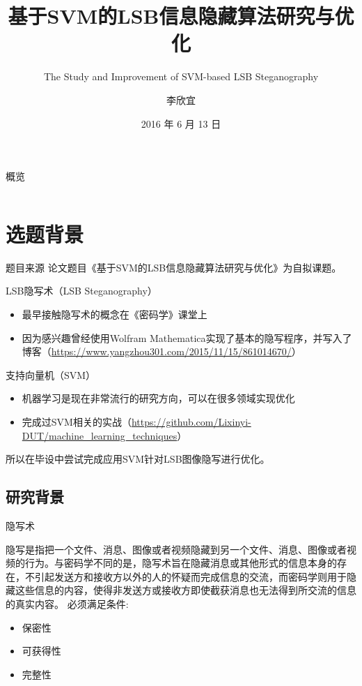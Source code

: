 \documentclass[14pt]{Bredelebeamer}
\title[本科毕设]{基于SVM的LSB信息隐藏算法研究与优化}
\subtitle{The Study and Improvement of SVM-based LSB Steganography}
\author[扬州计划]{李欣宜}
\institute[]{大连理工大学}
\date{\faCalendar{ } 2016 年 6 月 13 日}
\begin{document}
\begin{frame}
  \titlepage
\end{frame}

\begin{frame}{概览}
  \begin{columns}
    \begin{column}{.5\textwidth}
        \tableofcontents
    \end{column}
  \end{columns}
\end{frame}

\section{选题背景}
\begin{frame}{题目来源}
  论文题目《基于SVM的LSB信息隐藏算法研究与优化》为自拟课题。
  \begin{alertblock}{LSB隐写术（LSB Steganography）}
    \begin{itemize}
      \item 最早接触隐写术的概念在《密码学》课堂上
      \item 因为感兴趣曾经使用Wolfram Mathematica实现了基本的隐写程序，并写入了博客（\faChain \url{https://www.yangzhou301.com/2015/11/15/861014670/}）
    \end{itemize}
  \end{alertblock}
  \begin{block}{支持向量机（SVM）}
    \begin{itemize}
      \item 机器学习是现在非常流行的研究方向，可以在很多领域实现优化
      \item 完成过SVM相关的实战（\faChain \url{https://github.com/Lixinyi-DUT/machine_learning_techniques}）
    \end{itemize}
  \end{block}
  所以在毕设中尝试完成应用SVM针对LSB图像隐写进行优化。
\end{frame}

\subsection{研究背景}
\begin{frame}{隐写术}

{\large
隐写是指把一个文件、消息、图像或者视频隐藏到另一个文件、消息、图像或者视频的行为。与密码学不同的是，隐写术旨在隐藏消息或其他形式的信息本身的\alert{存在}，不引起发送方和接收方以外的人的怀疑而完成信息的交流，而密码学则用于隐藏这些信息的\alert{内容}，使得非发送方或接收方即使截获消息也无法得到所交流的信息的真实内容。
必须满足条件:
\begin{itemize}
  \item	保密性
  \item 可获得性
  \item 完整性
\end{itemize}
}
\end{frame}
\end{document}
